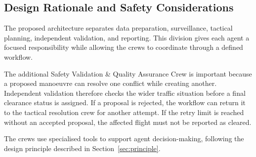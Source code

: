 \subsection{Design Rationale and Safety Considerations}

The proposed architecture separates data preparation, surveillance, tactical planning, independent validation, and reporting. This division gives each agent a focused responsibility while allowing the crews to coordinate through a defined workflow.

The additional Safety Validation \& Quality Assurance Crew is important because a proposed manoeuvre can resolve one conflict while creating another. Independent validation therefore checks the wider traffic situation before a final clearance status is assigned. If a proposal is rejected, the workflow can return it to the tactical resolution crew for another attempt. If the retry limit is reached without an accepted proposal, the affected flight must not be reported as cleared.


The crews use specialised tools to support agent decision-making, following the design principle described in Section~\ref{sec:principle}.
